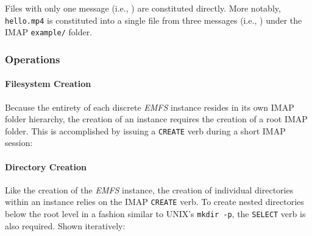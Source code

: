 \documentclass[12pt]{article}
\begin{document}
Files with only one message (i.e., ) are constituted directly.
More notably, \texttt{hello.mp4} is constituted into a single file from
three messages (i.e., ) under the IMAP \texttt{example/} folder.

\subsubsection{Operations}

\paragraph{Filesystem Creation}

Because the entirety of each discrete \textit{EMFS} instance resides in its
own IMAP folder hierarchy, the creation of an instance requires the creation of
a root IMAP folder. This is accomplished by issuing a \texttt{CREATE} verb
during a short IMAP session:

\begin{center}
\end{center}

\paragraph{Directory Creation}

Like the creation of the \textit{EMFS} instance, the creation of individual
directories within an instance relies on the IMAP \texttt{CREATE} verb. To
create nested directories below the root level in a fashion similar to UNIX's
\texttt{mkdir -p}, the \texttt{SELECT} verb is also required. Shown iteratively:
\end{document}

